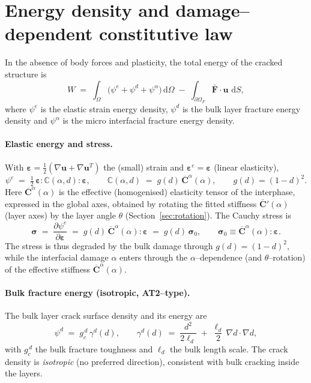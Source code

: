\documentclass[12pt,a4paper]{article}
\newcommand{\bF}{\mathbf{F}}
\newcommand{\bsig}{\boldsymbol{\sigma}}
\newcommand{\beps}{\boldsymbol{\varepsilon}}
\newcommand{\bu}{\mathbf{u}}
\newcommand{\Ca}{\overline{\mathbf{C}}^{\alpha}}     %
\newcommand{\Cp}{\overline{\mathbf{C}}'}             %
\newcommand{\Cad}{\mathbb{C}(\alpha,d)}              %
\newcommand{\dd}{\,\mathrm{d}}
\begin{document}
	\section{Energy density and damage--dependent constitutive law}\label{sec:energy}

	In the absence of body forces and plasticity, the total energy of the cracked
	structure is
	\begin{equation}\label{eq:W}
		W \;=\; \int_{\Omega}\bigl(\psi^e + \psi^d + \psi^{\alpha}\bigr)\dd\Omega
		\;-\; \int_{\partial\Omega_F}\bar{\bF}\cdot\bu\,\dd S,
	\end{equation}
	where $\psi^e$ is the elastic strain energy density, $\psi^d$ is the bulk layer
	fracture energy density and $\psi^{\alpha}$ is the micro interfacial fracture
	energy density.

	\paragraph{Elastic energy and stress.}
	With $\beps=\tfrac12(\nabla\bu+\nabla\bu^{T})$ the (small) strain and
	$\beps^e=\beps$ (linear elasticity),
	\begin{equation}\label{eq:psie}
		\psi^e \;=\; \tfrac12\,\beps:\Cad:\beps,
		\qquad
		\Cad \;=\; g(d)\,\Ca(\alpha),
		\qquad
		g(d)=(1-d)^2 .
	\end{equation}
	Here $\Ca(\alpha)$ is the effective (homogenised) elasticity tensor of the
	interphase, expressed in the global axes, obtained by rotating the fitted
	stiffness $\Cp(\alpha)$ (layer axes) by the layer angle $\theta$
	(Section~\ref{sec:rotation}). The Cauchy stress is
	\begin{equation}\label{eq:stress}
		\bsig \;=\; \frac{\partial\psi^e}{\partial\beps}
		\;=\; g(d)\,\Ca(\alpha):\beps
		\;=\; g(d)\,\bsig_0,
		\qquad
		\bsig_0 \equiv \Ca(\alpha):\beps .
	\end{equation}
	The stress is thus degraded by the bulk damage through $g(d)=(1-d)^2$, while the
	interfacial damage $\alpha$ enters through the $\alpha$--dependence (and
	$\theta$--rotation) of the effective stiffness $\Ca(\alpha)$.

	\paragraph{Bulk fracture energy (isotropic, AT2--type).}
	The bulk layer crack surface density and its energy are
	\begin{equation}\label{eq:gammad}
		\psi^d \;=\; g_c^{\,d}\,\gamma^d(d),
		\qquad
		\gamma^d(d) \;=\; \frac{d^2}{2\ell_d} \;+\; \frac{\ell_d}{2}\,\nabla d\cdot\nabla d,
	\end{equation}
	with $g_c^{\,d}$ the bulk fracture toughness and $\ell_d$ the bulk length scale.
	The crack density is \emph{isotropic} (no preferred direction), consistent with
	bulk cracking inside the layers.
\end{document}
